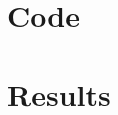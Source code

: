 \documentclass[10pt, a4paper]{article}
\begin{document}
    \section*{Code}
    
    \section*{Results}
    
\end{document}
